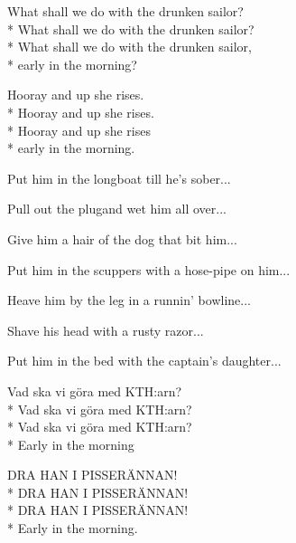 \begin{SongText}
    \begin{SongVerse}
        What shall we do with the drunken sailor?\\*%
        What shall we do with the drunken sailor?\\*%
        What shall we do with the drunken sailor,\\*%
        early in the morning?
    \end{SongVerse}
    \begin{SongVerse}
        Hooray and up she rises.\\*%
        Hooray and up she rises.\\*%
        Hooray and up she rises\\*%
        early in the morning.
    \end{SongVerse}
    \begin{SongVerse}
        Put him in the longboat till he's sober...
    \end{SongVerse}
    \begin{SongVerse}
        Pull out the plugand wet him all over...
    \end{SongVerse}
    \begin{SongVerse}
        Give him a hair of the dog that bit him...
    \end{SongVerse}
    \begin{SongVerse}
        Put him in the scuppers with a hose-pipe on him...
    \end{SongVerse}
    \begin{SongVerse}
        Heave him by the leg in a runnin' bowline...
    \end{SongVerse}
    \begin{SongVerse}
        Shave his head with a rusty razor...
    \end{SongVerse}
    \begin{SongVerse}
        Put him in the bed with the captain's daughter...
    \end{SongVerse}
    \begin{SongVerse}
        Vad ska vi göra med KTH:arn?\\*%
        Vad ska vi göra med KTH:arn?\\*%
        Vad ska vi göra med KTH:arn?\\*%
        Early in the morning
    \end{SongVerse}
    \begin{SongVerse}
        DRA HAN I PISSERÄNNAN!\\*%
        DRA HAN I PISSERÄNNAN!\\*%
        DRA HAN I PISSERÄNNAN!\\*%
        Early in the morning.
    \end{SongVerse}
\end{SongText}
